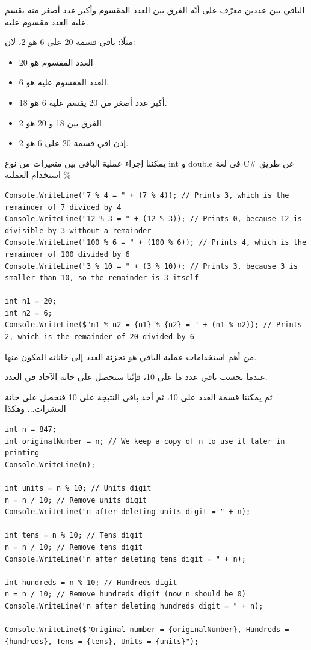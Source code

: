 \documentclass[14pt]{extarticle}
\begin{document}
الباقي بين عددين معرّف على أنّه الفرق بين العدد المقسوم وأكبر عدد أصغر منه يقسم عليه العدد مقسوم عليه.

مثلًا: باقي قسمة 20 على 6 هو 2، لأن:
\begin{itemize}
\item العدد المقسوم هو 20
\item العدد المقسوم عليه هو 6.
\item أكبر عدد أصغر من 20 يقسم عليه 6 هو 18.
\item الفرق بين 18 و 20 هو 2
\item إذن اقي قسمة 20 على 6 هو 2.
\end{itemize}

يمكننا إجراء عملية الباقي بين متغيرات من نوع \textenglish{int} و \textenglish{double} في لغة \textenglish{C\#} عن طريق استخدام العملية \textenglish{\%}

\begin{boxExample}
\begin{english}
\begin{verbatim}
Console.WriteLine("7 % 4 = " + (7 % 4)); // Prints 3, which is the remainder of 7 divided by 4
Console.WriteLine("12 % 3 = " + (12 % 3)); // Prints 0, because 12 is divisible by 3 without a remainder
Console.WriteLine("100 % 6 = " + (100 % 6)); // Prints 4, which is the remainder of 100 divided by 6
Console.WriteLine("3 % 10 = " + (3 % 10)); // Prints 3, because 3 is smaller than 10, so the remainder is 3 itself

int n1 = 20;
int n2 = 6;
Console.WriteLine($"n1 % n2 = {n1} % {n2} = " + (n1 % n2)); // Prints 2, which is the remainder of 20 divided by 6
\end{verbatim}
\end{english}
\end{boxExample}

من أهم استخدامات عملية الباقي هو تجزئة العدد إلى خاناته المكون منها.

عندما نحسب باقي عدد ما على 10، فإنّنا سنحصل على خانة الآحاد في العدد.

ثم يمكننا قسمة العدد على 10، ثم أخذ باقي النتيجة على 10 فنحصل على خانة العشرات... وهكذا

\begin{boxExample}
\begin{english}
\begin{verbatim}
int n = 847;
int originalNumber = n; // We keep a copy of n to use it later in printing
Console.WriteLine(n);

int units = n % 10; // Units digit
n = n / 10; // Remove units digit
Console.WriteLine("n after deleting units digit = " + n);

int tens = n % 10; // Tens digit
n = n / 10; // Remove tens digit
Console.WriteLine("n after deleting tens digit = " + n);

int hundreds = n % 10; // Hundreds digit
n = n / 10; // Remove hundreds digit (now n should be 0)
Console.WriteLine("n after deleting hundreds digit = " + n);

Console.WriteLine($"Original number = {originalNumber}, Hundreds = {hundreds}, Tens = {tens}, Units = {units}");
\end{verbatim}
\end{english}
\end{boxExample}
\end{document}
